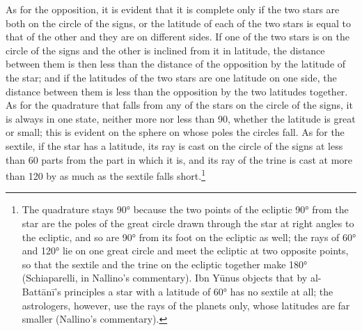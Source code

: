 \documentclass[11pt]{article}
\newcommand{\ArPage}[1]{\marginpar{\footnotesize\color{gray}Ar.\,p.\,#1}}
\begin{document}
\par \ArPage{197}As for the opposition, it is evident that it is complete only if the two stars are both on the circle of the signs, or the latitude of each of the two stars is equal to that of the other and they are on different sides. If one of the two stars is on the circle of the signs and the other is inclined from it in latitude, the distance between them is then less than the distance of the opposition by the latitude of the star; and if the latitudes of the two stars are one latitude on one side, the distance between them is less than the opposition by the two latitudes together. As for the quadrature that falls from any of the stars on the circle of the signs, it is always in one state, neither more nor less than 90, whether the latitude is great or small; this is evident on the sphere on whose poles the circles fall. As for the sextile, if the star has a latitude, its ray is cast on the circle of the signs at less than 60 parts from the part in which it is, and its ray of the trine is cast at more than 120 by as much as the sextile falls short.\footnote{The quadrature stays 90° because the two points of the ecliptic 90° from the star are the poles of the great circle drawn through the star at right angles to the ecliptic, and so are 90° from its foot on the ecliptic as well; the rays of 60° and 120° lie on one great circle and meet the ecliptic at two opposite points, so that the sextile and the trine on the ecliptic together make 180° (Schiaparelli, in Nallino's commentary). Ibn Yūnus objects that by al-Battānī's principles a star with a latitude of 60° has no sextile at all; the astrologers, however, use the rays of the planets only, whose latitudes are far smaller (Nallino's commentary).}\par
\end{document}

